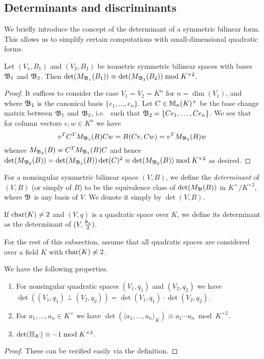 \documentclass[12pt, leqno, british]{amsart}
\begin{document}
\subsection{Determinants and discriminants}
We briefly introduce the concept of the determinant of a symmetric bilinear form.
This allows us to simplify certain computations with small-dimensional quadratic forms.
\begin{prop}
Let $(V_1, B_1)$ and $(V_2, B_2)$ be isometric symmetric bilinear spaces with bases $\mathfrak{B}_1$ and $\mathfrak{B}_2$.
Then $\det (M_\mathfrak{B_1}(B_1)) \equiv \det (M_{\mathfrak{B}_2}(B_2)) \bmod K^{\times 2}$.
\end{prop}
\begin{proof}
It suffices to consider the case $V_1 = V_2 = K^n$ for $n = \dim(V_1)$, and where $\mathfrak{B}_1$ is the canonical basis $\lbrace e_1, \ldots, e_n \rbrace$.
Let $C \in \mathbb{M}_n(K)^\times$ be the base change matrix between $\mathfrak{B}_1$ and $\mathfrak{B}_2$, i.e. ~such that $\mathfrak{B}_2 = \lbrace Ce_1, \ldots, Ce_n \rbrace$.
We see that for column vectors $v, w \in K^n$ we have
\begin{displaymath}
v^T C^T M_{\mathfrak{B}_{1}}(B) C w = B(Cv, Cw) = v^T M_{\mathfrak{B}_2}(B) w
\end{displaymath}
whence $M_{\mathfrak{B}_2}(B) = C^T M_{\mathfrak{B}_{1}}(B) C$ and hence $\det(M_{\mathfrak{B}_2}(B)) = \det(M_{\mathfrak{B}_{1}}(B)) \det(C)^2 \equiv \det(M_{\mathfrak{B}_2}(B)) \bmod K^{\times 2}$ as desired.
\end{proof}
\begin{defi}
For a nonsingular symmetric bilinear space $(V, B)$, we define the \emph{determinant} of $(V, B)$ (or simply of $B$) to be the equivalence class of $\det(M_{\mathfrak{B}}(B))$ in $K^\times/K^{\times 2}$, where $\mathfrak{B}$ is any basis of $V$.
We denote it simply by $\det(V, B)$.

If $\operatorname{char}(K) \neq 2$ and $(V, q)$ is a quadratic space over $K$, we define its determinant as the determinant of $(V, \frac{\mathfrak{b}_q}{2})$.
\end{defi}
For the rest of this subsection, assume that all quadratic spaces are considered over a field $K$ with $\operatorname{char}(K) \neq 2$.

\begin{prop}\label{P:det-computation-rules}
We have the following properties.
\begin{enumerate}
\item For nonsingular quadratic spaces $(V_1, q_1)$ and $(V_2, q_2)$ we have $\det ((V_1, q_1) \perp (V_2, q_2)) = \det(V_1, q_1) \cdot \det(V_2, q_2)$.
\item For $a_1, \ldots, a_n \in K^\times$ we have $\det(\langle a_1, \ldots, a_n \rangle_K) \equiv a_1 \cdots a_n \bmod K^{\times 2}$.
\item $\det(\mathbb{H}_K) \equiv -1 \bmod K^{\times 2}$.
\end{enumerate}
\end{prop}
\begin{proof}
These can be verified easily via the definition.
\end{proof}
\end{document}
